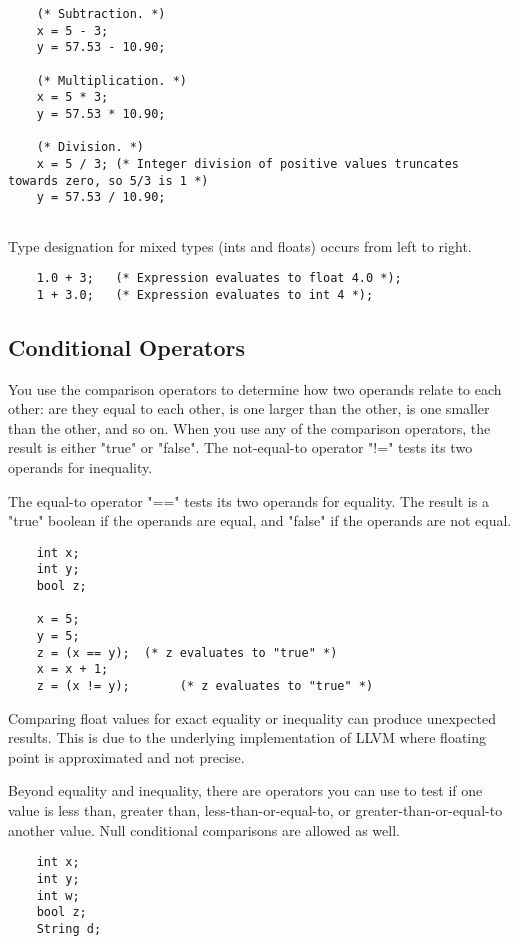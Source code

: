 \begin{homeworkProblem}
\begin{verbatim}
	(* Subtraction. *)
	x = 5 - 3;
	y = 57.53 - 10.90;
	
	(* Multiplication. *)
	x = 5 * 3;
	y = 57.53 * 10.90;
	
	(* Division. *)
	x = 5 / 3; (* Integer division of positive values truncates towards zero, so 5/3 is 1 *)
	y = 57.53 / 10.90;
	
	\end{verbatim}

	Type designation for mixed types (ints and floats) occurs from left to right.

	\begin{verbatim}
	1.0 + 3;   (* Expression evaluates to float 4.0 *);
	1 + 3.0;   (* Expression evaluates to int 4 *);
	\end{verbatim}
	
	\subsection{Conditional Operators}
	
	You use the comparison operators to determine how two operands relate to each other: are they equal to each other, is one larger than the other, is one smaller than the other, and so on. When you use any of the comparison operators, the result is either "true" or "false". The not-equal-to operator "!=" tests its two operands for inequality.
	
	The equal-to operator "==" tests its two operands for equality. The result is a "true" boolean if the operands are equal, and "false" if the operands are not equal.
	\begin{verbatim}
	int x;
	int y;
	bool z;

	x = 5;
	y = 5;
	z = (x == y);  (* z evaluates to "true" *)
	x = x + 1;
	z = (x != y);       (* z evaluates to "true" *)
	\end{verbatim}

	Comparing float values for exact equality or inequality can produce unexpected results. This is due to the underlying implementation of LLVM where floating point is approximated and not precise. 
	
	Beyond equality and inequality, there are operators you can use to test if one value is less than, greater than, less-than-or-equal-to, or greater-than-or-equal-to another value. Null conditional comparisons are allowed as well. 
	
	\begin{verbatim}
	int x;
	int y;
	int w;
	bool z;
	String d;


\end{verbatim}
\end{homeworkProblem}
